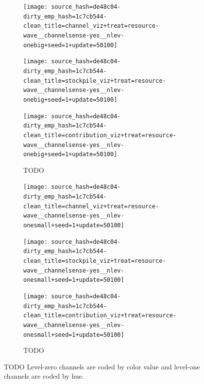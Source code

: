 \begin{figure}[!htbp]
\begin{center}
\begin{subfigure}[b]{\textwidth}
  \begin{minipage}{0.2\textwidth}
  \texttt{[image: source\_hash=de48c04-dirty\_emp\_hash=1c7cb544-clean\_title=channel\_viz+treat=resource-wave\_\_channelsense-yes\_\_nlev-onebig+seed=1+update=50100]}
  \end{minipage}
  \begin{minipage}{0.2\textwidth}
  \texttt{[image: source\_hash=de48c04-dirty\_emp\_hash=1c7cb544-clean\_title=stockpile\_viz+treat=resource-wave\_\_channelsense-yes\_\_nlev-onebig+seed=1+update=50100]}
  \end{minipage}
  \begin{minipage}{0.2\textwidth}
  \texttt{[image: source\_hash=de48c04-dirty\_emp\_hash=1c7cb544-clean\_title=contribution\_viz+treat=resource-wave\_\_channelsense-yes\_\_nlev-onebig+seed=1+update=50100]}
  \end{minipage}
  \begin{minipage}{0.2\textwidth}
  \caption{TODO}
  \label{fig:TODO}
  \end{minipage}
\end{subfigure}

\begin{subfigure}[b]{\textwidth}
  \begin{minipage}{0.2\textwidth}
  \texttt{[image: source\_hash=de48c04-dirty\_emp\_hash=1c7cb544-clean\_title=channel\_viz+treat=resource-wave\_\_channelsense-yes\_\_nlev-onesmall+seed=1+update=50100]}
  \end{minipage}
  \begin{minipage}{0.2\textwidth}
  \texttt{[image: source\_hash=de48c04-dirty\_emp\_hash=1c7cb544-clean\_title=stockpile\_viz+treat=resource-wave\_\_channelsense-yes\_\_nlev-onesmall+seed=1+update=50100]}
  \end{minipage}
  \begin{minipage}{0.2\textwidth}
  \texttt{[image: source\_hash=de48c04-dirty\_emp\_hash=1c7cb544-clean\_title=contribution\_viz+treat=resource-wave\_\_channelsense-yes\_\_nlev-onesmall+seed=1+update=50100]}
  \end{minipage}
  \begin{minipage}{0.2\textwidth}
  \caption{TODO}
  \label{fig:TODO}
  \end{minipage}
\end{subfigure}

\caption{
TODO
Level-zero channels are coded by color value and level-one channels are coded by hue.
}
\label{fig:outcome_grids}
\end{center}
\end{figure}
